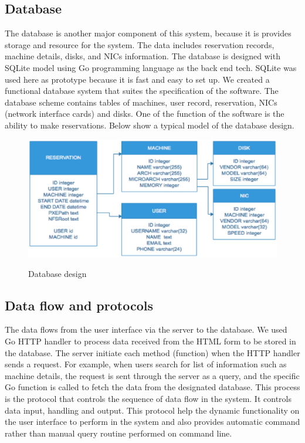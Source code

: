 \subsection{Database}
The database is another major component of this system, because it is provides storage and resource for the system. The data includes reservation records, machine details, disks, and NICs information. The database is designed with SQLite model using Go programming language as the back end tech. SQLite was used here as prototype because it is fast and easy to set up. We created a functional database system that suites the specification of the software. 
The database scheme contains tables of machines, user record, reservation, NICs (network interface cards) and disks.  One of the function of the software is the ability to make reservations.  Below show a typical model of the database design.
 \begin{figure}[h!]
\includegraphics[width = \linewidth]{database.eps}
\label{fig:Database Schema} 
\caption{Database design}
\end{figure}
\pagebreak
\subsection{Data flow and  protocols}
The data flows from the user interface via the server to the database. We used Go HTTP handler to process data received from the HTML form to be stored in the database. The server initiate each method (function) when the HTTP handler sends a request. For example, when users search for list of information such as machine details, the request is sent through the server as a query, and the specific Go function is called to fetch the data from the designated database. This process is the protocol that controls the sequence of data flow in the system. It controls data input, handling and output. This protocol help the dynamic functionality on the user interface to perform in the system and also provides automatic command rather than manual query routine performed on command line. 

